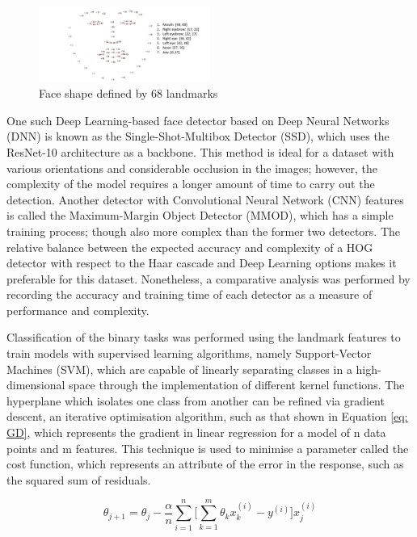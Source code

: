 \documentclass[conference]{IEEEtran}
\begin{document}
\begin{figure} [h] %
  \centering
    \includegraphics[width=0.5\textwidth]{graphs/landmarks} 
    \caption{Face shape defined by 68 landmarks}
    \label{fig: landmarks}
\end{figure}

One such Deep Learning-based face detector based on Deep Neural Networks (DNN) is known as the Single-Shot-Multibox Detector (SSD), which uses the ResNet-10 architecture as a backbone. This method is ideal for a dataset with various orientations and considerable occlusion in the images; however, the complexity of the model requires a longer amount of time to carry out the detection.
Another detector with Convolutional Neural Network (CNN) features is called the Maximum-Margin Object Detector (MMOD), which has a simple training process; though also more complex than the former two detectors.
The relative balance between the expected accuracy and complexity of a HOG detector with respect to the Haar cascade and Deep Learning options makes it preferable for this dataset. Nonetheless, a comparative analysis was performed by recording the accuracy and training time of each detector as a measure of performance and complexity.

Classification of the binary tasks was performed using the landmark features to train models with supervised learning algorithms, namely Support-Vector Machines (SVM), which are capable of linearly separating classes in a high-dimensional space through the implementation of different kernel functions. 
The hyperplane which isolates one class from another can be refined via gradient descent, an iterative optimisation algorithm, such as that shown in Equation \ref{eq: GD}, which represents the gradient in linear regression for a model of n data points and m features. This technique is used to minimise a parameter called the cost function, which represents an attribute of the error in the response, such as the squared sum of residuals.

\begin{equation}
\theta_{j+1} = \theta_j - \frac{\alpha}{n} \sum_{i=1}^n \bigg[\sum_{k=1}^m \theta_k x_k^{(i)} - y^{(i)} \bigg] x_j^{(i)} 
\label{eq: GD}
\end{equation}
\end{document}
